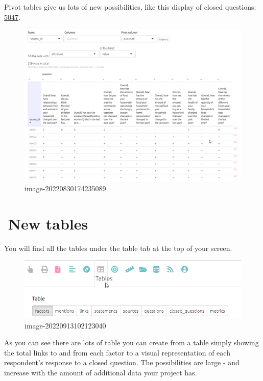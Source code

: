 \documentclass[
]{book}
\begin{document}
Pivot tables give us lots of new possibilities, like this display of closed questions: \href{https://causalmap.shinyapps.io/tokyo/?s=5047}{5047}.

\begin{figure}
\centering
\includegraphics{_assets/image-20220830174235089.png}
\caption{image-20220830174235089}
\end{figure}

\hypertarget{xall-tables}{%
\chapter{🧪New tables}\label{xall-tables}}

You will find all the tables under the table tab at the top of your screen.

\begin{figure}
\centering
\includegraphics[width=6.77083in,height=\textheight]{_assets/image-20220913102123040.png}
\caption{image-20220913102123040}
\end{figure}

As you can see there are lots of table you can create from a table simply showing the total links to and from each factor to a visual representation of each respondent's response to a closed question. The possibilities are large - and increase with the amount of additional data your project has.
\end{document}
